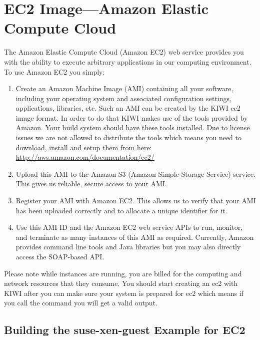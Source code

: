 \chapter{EC2 Image---Amazon Elastic Compute Cloud}
\label{chapter:ec2}
\minitoc

The Amazon Elastic Compute Cloud (Amazon EC2) web service provides you
with the ability to execute arbitrary applications in our computing
environment. To use Amazon EC2 you simply:

\begin{enumerate}
\item Create an Amazon Machine Image (AMI) containing all your software,
      including your operating system and associated configuration settings,
      applications, libraries, etc. Such an AMI can be created by the KIWI
      ec2 image format. In order to do that KIWI makes use of the tools
      provided by Amazon. Your build system should have these tools
      installed. Due to license issues we are not allowed to distribute
      the tools which means you need to download, install and setup
      them from here:\\
      \url{http://aws.amazon.com/documentation/ec2/}
\item Upload this AMI to the Amazon S3 (Amazon Simple Storage Service)
      service. This gives us reliable, secure access to your AMI.
\item Register your AMI with Amazon EC2. This allows us to verify that your
      AMI has been uploaded correctly and to allocate a unique identifier
      for it.
\item Use this AMI ID and the Amazon EC2 web service APIs to run, monitor,
      and terminate as many instances of this AMI as required. Currently,
      Amazon provides command line tools and Java libraries but you may also
      directly access the SOAP-based API.
\end{enumerate}

Please note while instances are running, you are billed for the
computing and network resources that they consume.
You should start creating an ec2 with KIWI after you can make sure
your system is prepared for ec2 which means if you call the command
 you will get a valid output.

\section{Building the suse-xen-guest Example for EC2}

